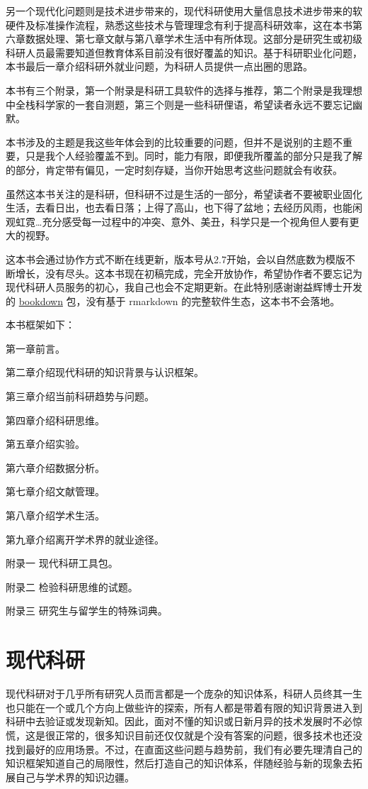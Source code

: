 \documentclass[]{tufte-book}
\begin{document}
另一个现代化问题则是技术进步带来的，现代科研使用大量信息技术进步带来的软硬件及标准操作流程，熟悉这些技术与管理理念有利于提高科研效率，这在本书第六章数据处理、第七章文献与第八章学术生活中有所体现。这部分是研究生或初级科研人员最需要知道但教育体系目前没有很好覆盖的知识。基于科研职业化问题，本书最后一章介绍科研外就业问题，为科研人员提供一点出圈的思路。

本书有三个附录，第一个附录是科研工具软件的选择与推荐，第二个附录是我理想中全栈科学家的一套自测题，第三个则是一些科研俚语，希望读者永远不要忘记幽默。

本书涉及的主题是我这些年体会到的比较重要的问题，但并不是说别的主题不重要，只是我个人经验覆盖不到。同时，能力有限，即便我所覆盖的部分只是我了解的部分，肯定带有偏见，一定时刻存疑，当你开始思考这些问题就会有收获。

虽然这本书关注的是科研，但科研不过是生活的一部分，希望读者不要被职业固化生活，去看日出，也去看日落；上得了高山，也下得了盆地；去经历风雨，也能闲观虹霓\ldots 充分感受每一过程中的冲突、意外、美丑，科学只是一个视角但人要有更大的视野。

这本书会通过协作方式不断在线更新，版本号从2.7开始，会以自然底数为模版不断增长，没有尽头。这本书现在初稿完成，完全开放协作，希望协作者不要忘记为现代科研人员服务的初心，我自己也会不定期更新。在此特别感谢谢益辉博士开发的 \href{https://bookdown.org/yihui/bookdown/}{bookdown} 包，没有基于 rmarkdown 的完整软件生态，这本书不会落地。

本书框架如下：

第一章前言。

第二章介绍现代科研的知识背景与认识框架。

第三章介绍当前科研趋势与问题。

第四章介绍科研思维。

第五章介绍实验。

第六章介绍数据分析。

第七章介绍文献管理。

第八章介绍学术生活。

第九章介绍离开学术界的就业途径。

附录一 现代科研工具包。

附录二 检验科研思维的试题。

附录三 研究生与留学生的特殊词典。

\hypertarget{intro}{%
\chapter{现代科研}\label{intro}}

现代科研对于几乎所有研究人员而言都是一个庞杂的知识体系，科研人员终其一生也只能在一个或几个方向上做些许的探索，所有人都是带着有限的知识背景进入到科研中去验证或发现新知。因此，面对不懂的知识或日新月异的技术发展时不必惊慌，这是很正常的，很多知识目前还仅仅就是个没有答案的问题，很多技术也还没找到最好的应用场景。不过，在直面这些问题与趋势前，我们有必要先理清自己的知识框架知道自己的局限性，然后打造自己的知识体系，伴随经验与新的现象去拓展自己与学术界的知识边疆。
\end{document}
